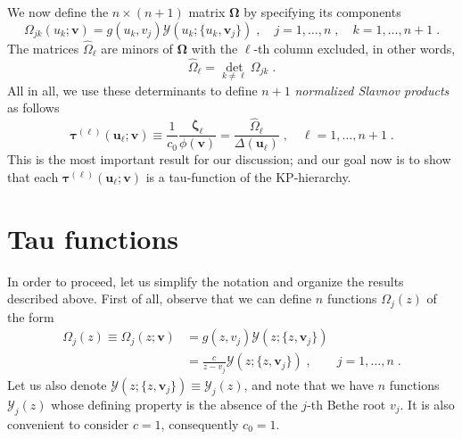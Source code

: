 \documentclass[a4paper,12pt]{amsart}
\begin{document}
We now define the \(n\times (n+1)\) matrix \(\bm{\Omega}\) by specifying its components
\begin{equation}
  \label{eq:omega-matrix-def}
  \Omega_{jk}(u_k; \bm{v}) = g(u_k, v_j) \mathcal{Y}(u_k; \{u_k, \bm{v}_j\})\; ,
  \quad j= 1, \dots, n\; , \quad k =1, \dots, n+1\; .
\end{equation}
The matrices \(\hat{\Omega}_\ell\) are minors of
\(\bm{\Omega}\) with the \(\ell\)-th column excluded, in other words,
\begin{equation}
 \hat{\Omega}_\ell = \det_{k\neq \ell} \Omega_{jk}\; . 
\end{equation}
All in all, we use these determinants to define \(n+1\)
\emph{normalized Slavnov products} as follows
\begin{equation}
  \label{eq:slavnov-tau}
  \bm{\tau}^{(\ell)}(\bm{u}_\ell; \bm{v}) \equiv \frac{1}{c_0}\frac{\bm{\zeta}_\ell}{\phi(\bm{v})}
  = \frac{\hat{\Omega}_{\ell}}{\Delta(\bm{u}_\ell)}\; , \quad \ell = 1, \dots, n+1 \; .
\end{equation}
This is the most important result for our discussion; and our goal now
is to show that each \(\bm{\tau}^{(\ell)}(\bm{u}_\ell; \bm{v})\) is a
tau-function of the KP-hierarchy.





\section{Tau functions}

In order to proceed, let us simplify the notation and organize the
results described above. First of all, observe that we can define
\(n\) functions \(\Omega_j(z)\) of the form
\begin{equation}
\begin{split}
  \Omega_{j}(z) \equiv
  \Omega_{j}(z; \bm{v}) & = g(z, v_j) \mathcal{Y}(z; \{z, \bm{v}_j\})\\
   & = \frac{c}{z - v_j} \mathcal{Y}(z; \{z, \bm{v}_j\})\; , \qquad j =1, \dots, n \; .
\end{split}
\end{equation}
Let us also denote \(\mathcal{Y}(z; \{z, \bm{v}_j\}) \equiv
\mathcal{Y}_j(z)\), and note that we have \(n\) functions
\(\mathcal{Y}_j(z)\) whose defining property is the absence of the
\(j\)-th Bethe root \(v_j\).  It is also convenient to consider
\(c=1\), consequently \(c_0=1\).
\end{document}
